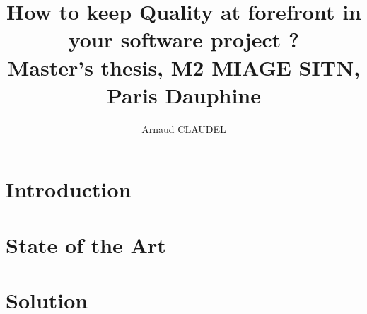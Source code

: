 \documentclass[12pt]{report}
\title{
How to keep Quality at forefront in your software project ?
\\ {\large Master's thesis, M2 MIAGE SITN, Paris Dauphine}}
\author{Arnaud CLAUDEL}
\begin{document}
    \maketitle
    \tableofcontents

    \chapter{Introduction}\label{ch:introduction}
    

    \chapter{State of the Art}\label{ch:state-of-the-art}
    

    \chapter{Solution}\label{ch:solution}
    
\end{document}

